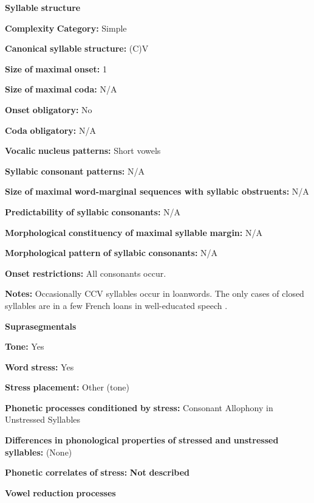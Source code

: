 \begin{styleBody}
\textbf{Syllable} \textbf{structure}

\textbf{Complexity} \textbf{Category:} Simple

\textbf{Canonical} \textbf{syllable} \textbf{structure:} (C)V \citep[112-114]{Morse1976}

\textbf{Size} \textbf{of} \textbf{maximal} \textbf{onset:} 1

\textbf{Size} \textbf{of} \textbf{maximal} \textbf{coda:} N/A

\textbf{Onset} \textbf{obligatory:} No

\textbf{Coda} \textbf{obligatory:} N/A

\textbf{Vocalic} \textbf{nucleus} \textbf{patterns:} Short vowels

\textbf{Syllabic} \textbf{consonant} \textbf{patterns:} N/A

\textbf{Size} \textbf{of} \textbf{maximal} \textbf{word{}-marginal sequences with syllabic obstruents:} N/A

\textbf{Predictability} \textbf{of} \textbf{syllabic} \textbf{consonants:} N/A

\textbf{Morphological} \textbf{constituency} \textbf{of} \textbf{maximal} \textbf{syllable} \textbf{margin:} N/A

\textbf{Morphological} \textbf{pattern} \textbf{of} \textbf{syllabic} \textbf{consonants:} N/A

\textbf{Onset} \textbf{restrictions:} All consonants occur.

\textbf{Notes:} Occasionally CCV syllables occur in loanwords. The only cases of closed syllables are in a few French loans in well-educated speech \citep[113]{Morse1976}.

\textbf{Suprasegmentals}

\textbf{Tone:} Yes

\textbf{Word} \textbf{stress:} Yes

\textbf{Stress} \textbf{placement:} Other (tone)

\textbf{Phonetic} \textbf{processes} \textbf{conditioned} \textbf{by} \textbf{stress:} Consonant Allophony in Unstressed Syllables

\textbf{Differences} \textbf{in} \textbf{phonological} \textbf{properties} \textbf{of} \textbf{stressed} \textbf{and} \textbf{unstressed} \textbf{syllables:} (None)

\textbf{Phonetic} \textbf{correlates} \textbf{of} \textbf{stress:} \textbf{Not} \textbf{described}

\textbf{Vowel} \textbf{reduction} \textbf{processes}


\end{styleBody}
